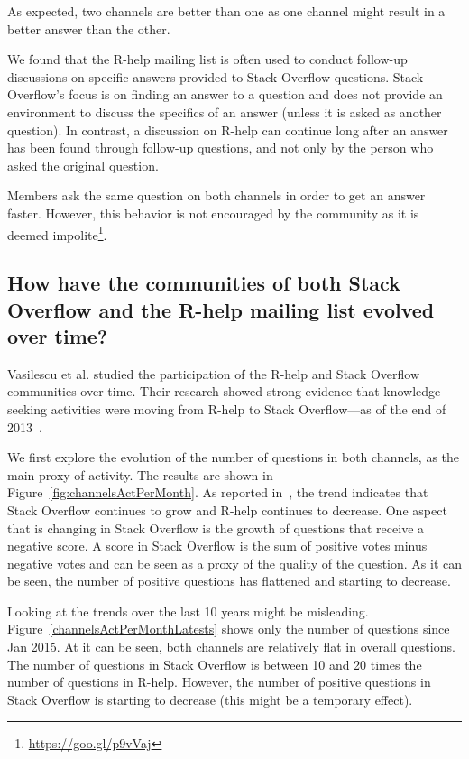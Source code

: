\documentclass[smallextended]{svjour3}       %
\newcommand{\SO}{Stack Overflow\xspace}
\newcommand{\RH}{R-help\xspace}
\newcommand{\rqd}{How have the communities of both Stack Overflow and the R-help mailing list evolved over time?}
\begin{document}
\begin{description}[itemsep=2pt, topsep=0pt, leftmargin=1em, parsep=0pt]
\item[Find a better answer:] As expected, two channels are better than one as 
  one channel might result in a better answer than the other.
\item[Support follow-up questions:] We found that the \RH mailing list is often used to conduct follow-up discussions on
  specific answers provided to \SO questions. \SO's focus is on finding an answer to a question and does not
  provide an environment to discuss the specifics of an answer (unless it is asked as another question).
In contrast, a discussion on \RH can continue long after an answer has been found through follow-up questions, and not only by the person who asked the original question.  
\item[Speed up answers:] Members ask the same question on both channels in order to get an answer faster. However, this behavior is not encouraged by the community as it is deemed impolite\footnote{\href{https://goo.gl/p9vVaj}{https://goo.gl/p9vVaj}}.
\end{description}


\subsection{\rqd}

Vasilescu et al. studied the participation of the \RH and \SO communities over time. Their
research showed strong evidence that knowledge seeking activities were moving from \RH to \SO---as of the end of
2013~\cite{Vasilescu2014c}.

We first explore the evolution of the number of questions in both channels, as the main proxy of activity. The results
are shown in Figure~\ref{fig:channelsActPerMonth}. As reported in~\cite{Vasilescu2014c}, the trend indicates that \SO
continues to grow and \RH continues to decrease. One aspect that is changing in \SO is the growth of questions that
receive a negative score. A score in \SO is the sum of positive votes minus negative votes and can be seen as a proxy of
the quality of the question. As it can be seen, the number of positive questions has flattened and starting to decrease.

Looking at the trends over the last 10 years might be misleading. Figure~\ref{channelsActPerMonthLatests} shows only the
number of questions since Jan 2015. At it can be seen, both channels are relatively flat in overall questions. The
number of questions in \SO is between 10 and 20 times the number of questions in \RH. However, the number of positive
questions in \SO is starting to decrease (this might be a temporary effect).
\end{document}

